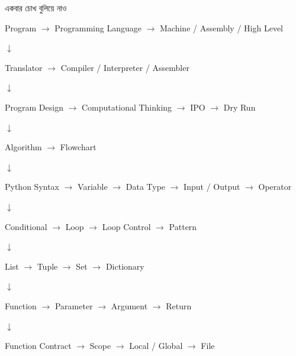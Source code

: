 \begin{revisionbox}{একবার চোখ বুলিয়ে নাও}

\begin{center}

Program
\(\rightarrow\)
Programming Language
\(\rightarrow\)
Machine / Assembly / High Level

\medskip

\(\downarrow\)

Translator
\(\rightarrow\)
Compiler / Interpreter / Assembler

\medskip

\(\downarrow\)

Program Design
\(\rightarrow\)
Computational Thinking
\(\rightarrow\)
IPO
\(\rightarrow\)
Dry Run

\medskip

\(\downarrow\)

Algorithm
\(\rightarrow\)
Flowchart

\medskip

\(\downarrow\)

Python Syntax
\(\rightarrow\)
Variable
\(\rightarrow\)
Data Type
\(\rightarrow\)
Input / Output
\(\rightarrow\)
Operator

\medskip

\(\downarrow\)

Conditional
\(\rightarrow\)
Loop
\(\rightarrow\)
Loop Control
\(\rightarrow\)
Pattern

\medskip

\(\downarrow\)

List
\(\rightarrow\)
Tuple
\(\rightarrow\)
Set
\(\rightarrow\)
Dictionary

\medskip

\(\downarrow\)

Function
\(\rightarrow\)
Parameter
\(\rightarrow\)
Argument
\(\rightarrow\)
Return

\medskip

\(\downarrow\)

Function Contract
\(\rightarrow\)
Scope
\(\rightarrow\)
Local / Global
\(\rightarrow\)
File

\end{center}

\end{revisionbox}


